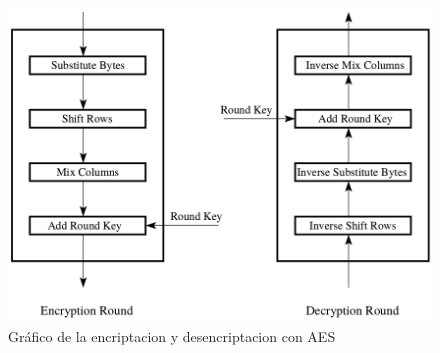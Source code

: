 \documentclass[11pt, conference]{IEEEtran}
\begin{document}
\begin{figure}[h]
	\centering
	\includegraphics[scale=0.28]{aes_main.png} 
	\caption{Gráfico de la encriptacion y desencriptacion con AES}
\end{figure}
\end{document}
